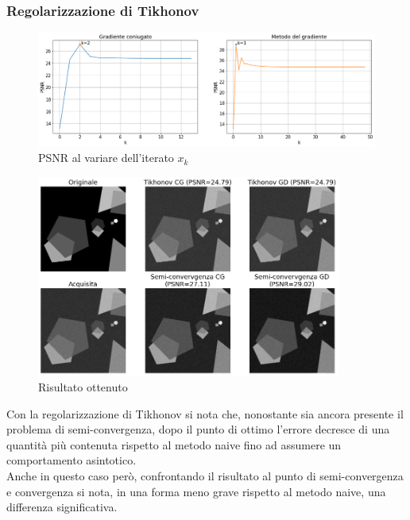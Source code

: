 \documentclass[11pt]{article}
\begin{document}
\subsubsection{Regolarizzazione di Tikhonov}
\begin{figure}[H]
    \centering
    \includegraphics[width=15cm]{semiconvergenza/1/psnr_tikhonov.png}
    \caption{PSNR al variare dell'iterato $x_k$}
    \label{fig:semiconv_psnr_tikhonov1}
\end{figure}
\begin{figure}[H]
    \centering
    \includegraphics[width=10cm]{semiconvergenza/1/deblur_tikhonov.png}
    \caption{Risultato ottenuto}
    \label{fig:semiconv_deblur_tikhonov1}
\end{figure}
Con la regolarizzazione di Tikhonov si nota che, nonostante sia ancora presente il problema di semi-convergenza, dopo il punto di ottimo l'errore decresce di una quantità più contenuta rispetto al metodo naive fino ad assumere un comportamento asintotico.\\
Anche in questo caso però, confrontando il risultato al punto di semi-convergenza e convergenza si nota, in una forma meno grave rispetto al metodo naive, una differenza significativa.
\end{document}
